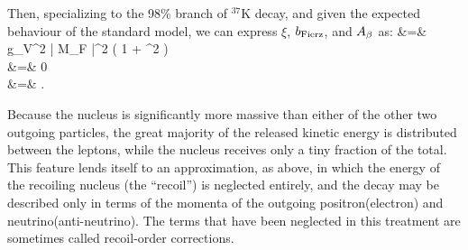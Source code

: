 Then, specializing to the 98\% branch of $^{37}$K decay, and given the expected behaviour of the standard model,
we can express $\xi$, $b_{\mathrm{Fierz}}$, and $A_{\beta}$ as:
\bea
\xi &=& g_V^2 | M_F |^2 \left( 1 + \rho^2 \right)
\label{eq:xiwithrho_intro} 
\\
\bFierz &=& 0 
\label{bFierzwithrho_intro}
\\
\Abeta &=& .
\label{eq:Awithrho_intro}
\eea



Because the nucleus is significantly more massive than either of the other two outgoing particles, the great majority of the released kinetic energy is distributed between the leptons, while the nucleus receives only a tiny fraction of the total.  This feature lends itself to an approximation, as above, in which the energy of the recoiling nucleus (the ``recoil'') is neglected entirely, and the decay may be described only in terms of the momenta of the outgoing positron(electron) and neutrino(anti-neutrino).  
The terms that have been neglected in this treatment are sometimes called recoil-order corrections.


